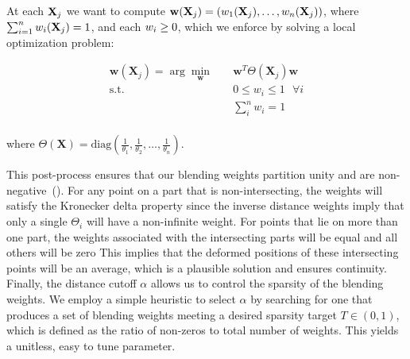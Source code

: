 
At each $\mathbf{X}_j$ we want to compute $\mathbf{w}(\mathbf{X}_j) =  \left( w_1(\mathbf{X}_j), \dots, w_n(\mathbf{X}_j) \right)$, where 
$\sum_{i=1}^nw_i(\mathbf{X}_j) = 1$, and each $w_i \geq 0$, which we enforce by solving a local optimization problem: 

\begin{equation}
\begin{aligned}
\mathbf{w}(\mathbf{X}_j) =  \arg\min_{\mathbf{w}} \quad & \mathbf{w}^T \Theta(\mathbf{X}_j) \mathbf{w}    \\
\textrm{s.t.} \quad & 0 \leq w_i \leq 1 \mbox{ }\forall i                    \\
                  &   \sum_i^n w_i = 1                      \\
\end{aligned}
\end{equation}

where $\Theta(\mathbf{X}) = \text{diag}\left( \frac{1}{\theta_1},\frac{1}{\theta_2},\dots,\frac{1}{\theta_n}\right)$. 

            


This post-process ensures that our blending weights partition unity and are non-negative~(). 
For any point on a part that is non-intersecting, the weights will satisfy the Kronecker delta property since the inverse distance weights imply that only
a single $\Theta_i$ will have a non-infinite weight. 
For points that lie on more than one part, the weights associated with the intersecting parts will be equal and all others will be zero
This implies that the deformed positions of these intersecting points will be an average, which is a plausible solution and ensures continuity.
Finally, the distance cutoff $\alpha$ allows us to control the sparsity of the blending weights. We employ a simple heuristic to select $\alpha$ by searching for one that produces a set of blending weights meeting a desired sparsity target $T \in \left( 0,1\right)$, which is defined as the ratio of non-zeros to total number of weights. This yields a unitless, easy to tune parameter.

